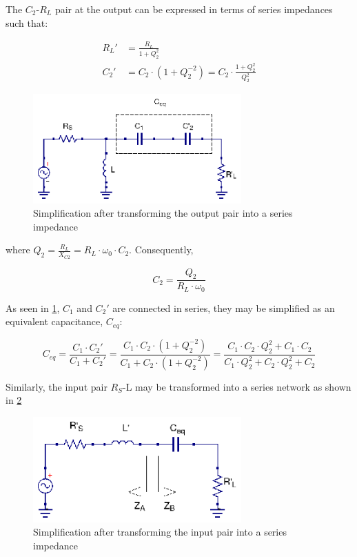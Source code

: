 \noindent The $C_2$-$R_L$ pair at the output can be expressed in terms of series impedances such that:

\begin{align}
  R_L' &= \frac{R_L}{1 + Q_2^2}\\
  C_2' &= C_2 \cdot (1 + Q_2^{-2}) = C_2 \cdot \frac{1 + Q_2^2}{Q_2^2}
\end{align}


\begin{figure}[H]
\centering
\includegraphics[width=80mm]{Tapped-C-ckt-equivalent}
\caption{Simplification after transforming the output pair into a series impedance}
\label{fig:tapped-c-simplification}
\end{figure}


\noindent where $Q_2 = \frac{R_L}{X_{C2}} = R_L \cdot \omega_0 \cdot C_2$. Consequently,

\begin{equation}
C_2 = \frac{Q_2}{R_L \cdot \omega_0}
\end{equation}

\noindent As seen in \ref{fig:tapped-c-simplification}, $C_1$ and $C_2'$ are connected in series, they may be simplified as an equivalent capacitance, $C_{eq}$:

\begin{equation}
C_{eq} = \frac{C_1 \cdot C_2'}{C_1 + C_2'} = \frac{C_1 \cdot C_2 \cdot (1 + Q_2^{-2})}{C_1 + C_2 \cdot(1 + Q_2^{-2})} = \frac{C_1 \cdot C_2 \cdot Q_2^2 + C_1 \cdot C_2}{C_1 \cdot Q_2^2 + C_2 \cdot Q_2^2 + C_2}
\end{equation}

\noindent Similarly, the input pair $R_S$-L may be transformed into a series network as shown in \ref{fig:tapped-c-simplification-input}

\begin{figure}[H]
\centering
\includegraphics[width=80mm]{Tapped-C-ckt-equivalent-input-pair-transformed}
\caption{Simplification after transforming the input pair into a series impedance}
\label{fig:tapped-c-simplification-input}
\end{figure}

